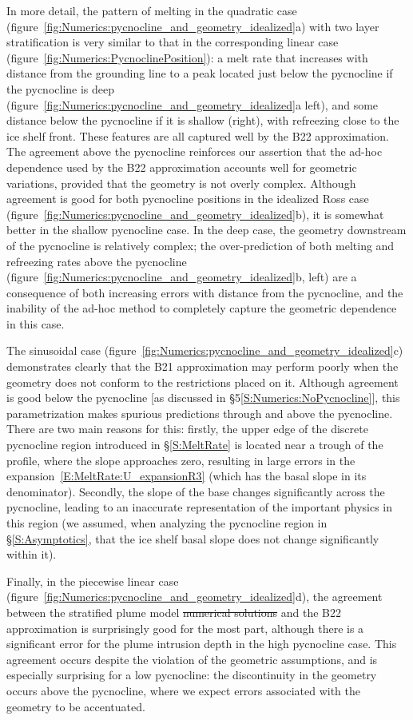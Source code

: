 \documentclass[openacc]{rsproca_new}%
\newcommand{\red}[1]{{\color{red} #1}}
\newcommand{\blue}[1]{{\color{blue} #1}}
\newcommand{\rout}[1]{\red{\st{#1}}}\newcommand{\ab}[1]{\textcolor{Green}{#1}}\newcommand{\about}[1]{\textcolor{Cyan}{\sout{#1}}}
\begin{document}
In more detail, the pattern of melting in the quadratic case (figure~\ref{fig:Numerics:pycnocline_and_geometry_idealized}a) with two layer stratification is very similar to that in the corresponding linear case (figure~\ref{fig:Numerics:PycnoclinePosition}): a melt rate that increases with distance from the grounding line to a peak located just below the pycnocline if the pycnocline is deep (figure~\ref{fig:Numerics:pycnocline_and_geometry_idealized}a left), and some distance below the pycnocline if it is shallow (right), with refreezing close to the ice shelf front. These features are all captured well by the B22 approximation. The agreement above the pycnocline reinforces our assertion that the ad-hoc dependence used by the B22 approximation accounts well for geometric variations, provided that the geometry is not overly complex. Although agreement is good for both pycnocline positions in the idealized Ross case (figure~\ref{fig:Numerics:pycnocline_and_geometry_idealized}b), it is somewhat better in the shallow pycnocline case. In the deep case, the geometry downstream of the pycnocline is relatively complex; the over-prediction of both melting and refreezing rates above the pycnocline (figure~\ref{fig:Numerics:pycnocline_and_geometry_idealized}b, left) are a consequence of both increasing errors with distance from the pycnocline, and the inability of the ad-hoc method to completely capture the geometric dependence in this case. 

The sinusoidal case (figure~\ref{fig:Numerics:pycnocline_and_geometry_idealized}c) demonstrates clearly that the B21 approximation may perform poorly when the geometry does not conform to the restrictions placed on it. Although agreement is good below the pycnocline [as discussed in \S5\ref{S:Numerics:NoPycnocline}], this parametrization makes spurious predictions through and above the pycnocline. There are two main reasons for this: firstly, the upper edge of the discrete pycnocline region introduced in \S\ref{S:MeltRate} is located near a trough of the profile, where the slope approaches zero, resulting in large errors in the expansion~\eqref{E:MeltRate:U_expansionR3} (which has the basal slope in its denominator).  Secondly, the slope of the base changes significantly across the pycnocline, leading to an inaccurate representation of the important physics in this region (we assumed, when analyzing the pycnocline region in \S\ref{S:Asymptotics}, that the ice shelf basal slope does not change significantly within it).

Finally, in the piecewise linear case (figure~\ref{fig:Numerics:pycnocline_and_geometry_idealized}d), the agreement between \blue{the stratified plume model}\rout{numerical solutions} and the B22 approximation is surprisingly good for the most part, although there is a significant error for the plume intrusion depth in the high pycnocline case. This agreement occurs despite the violation of the geometric assumptions, and is especially surprising for a low pycnocline: the discontinuity in the geometry occurs above the pycnocline, where we expect errors associated with the geometry to be accentuated. 
\end{document}
